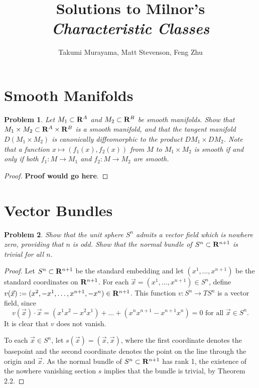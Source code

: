 \documentclass[12pt,letterpaper]{article}
\title{Solutions to Milnor's \emph{Characteristic Classes}}
\author{Takumi Murayama, Matt Stevenson, Feng Zhu}
\newtheorem{problem}{Problem}[section]
\numberwithin{equation}{section}
\newcommand{\RR}{\ensuremath \mathbf{R}}
\begin{document}
\maketitle
\section{Smooth Manifolds}
\begin{problem}
  Let $M_1 \subset \RR^A$ and $M_2 \subset \RR^B$ be smooth manifolds. Show that
  $M_1 \times M_2 \subset \RR^A \times \RR^B$ is a smooth manifold, and that the
  tangent manifold $D(M_1 \times M_2)$ is canonically diffeomorphic to the
  product $DM_1 \times DM_2$. Note that a function $x \mapsto (f_1(x),f_2(x))$
  from $M$ to $M_1 \times M_2$ is smooth if and only if both $f_1 \colon M \to
  M_1$ and $f_2 \colon M \to M_2$ are smooth.
\end{problem}
\begin{proof}
  \textbf{Proof would go here}.
\end{proof}

\section{Vector Bundles}

\begin{problem}
Show that the unit sphere $S^n$ admits a vector field which is nowhere zero, providing that $n$ is odd. Show that the normal bundle of $S^n \subset \RR^{n+1}$ is trivial for all $n$.
\end{problem}

\begin{proof}
Let $S^n \subset \RR^{n+1}$ be the standard embedding and let $(x^1,\ldots,x^{n+1})$ be the standard coordinates on $\RR^{n+1}$. For each $\vec{x} = (x^1,\ldots,x^{n+1}) \in S^n$, define $v(\vec{x}) := (x^2, -x^1, \ldots, x^{n+1}, -x^n) \in \RR^{n+1}$. This function $v \colon S^n \to TS^n$ is a vector field, since 
\[
v(\vec{x}) \cdot \vec{x}  = (x^1 x^2 - x^2 x^1 ) + \ldots + (x^{n} x^{n+1} - x^{n+1} x^n) = 0 \textrm{ for all $\vec{x} \in S^n$.}
\]
It is clear that $v$ does not vanish.

To each $\vec{x} \in S^n$, let $s(\vec{x}) = (\vec{x},\vec{x})$, where the first coordinate denotes the basepoint and the second coordinate denotes the point on the line through the origin and $\vec{x}$. As the normal bundle of $S^n \subset \RR^{n+1}$ has rank 1, the existence of the nowhere vanishing section $s$ implies that the bundle is trivial, by Theorem 2.2.

\end{proof}
\end{document}
